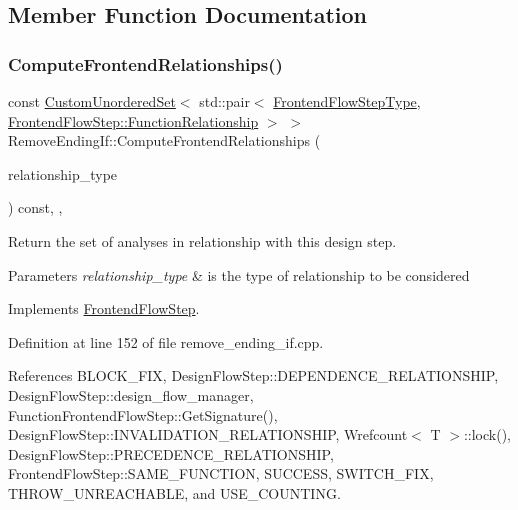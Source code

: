 \subsection{Member Function Documentation}
\mbox{\label{classRemoveEndingIf_a028dba75b4b90e6a322030b4a2d6eebe}} 
\subsubsection{\texorpdfstring{Compute\+Frontend\+Relationships()}{ComputeFrontendRelationships()}}
{\footnotesize\ttfamily const \hyperlink{classCustomUnorderedSet}{Custom\+Unordered\+Set}$<$ std\+::pair$<$ \hyperlink{frontend__flow__step_8hpp_afeb3716c693d2b2e4ed3e6d04c3b63bb}{Frontend\+Flow\+Step\+Type}, \hyperlink{classFrontendFlowStep_af7cf30f2023e5b99e637dc2058289ab0}{Frontend\+Flow\+Step\+::\+Function\+Relationship} $>$ $>$ Remove\+Ending\+If\+::\+Compute\+Frontend\+Relationships (\begin{DoxyParamCaption}\item[{const \hyperlink{classDesignFlowStep_a723a3baf19ff2ceb77bc13e099d0b1b7}{Design\+Flow\+Step\+::\+Relationship\+Type}}]{relationship\+\_\+type }\end{DoxyParamCaption}) const\hspace{0.3cm}{\ttfamily [override]}, {\ttfamily [private]}, {\ttfamily [virtual]}}



Return the set of analyses in relationship with this design step. 


\begin{DoxyParams}{Parameters}
{\em relationship\+\_\+type} & is the type of relationship to be considered \\
\hline
\end{DoxyParams}


Implements \hyperlink{classFrontendFlowStep_abeaff70b59734e462d347ed343dd700d}{Frontend\+Flow\+Step}.



Definition at line 152 of file remove\+\_\+ending\+\_\+if.\+cpp.



References B\+L\+O\+C\+K\+\_\+\+F\+IX, Design\+Flow\+Step\+::\+D\+E\+P\+E\+N\+D\+E\+N\+C\+E\+\_\+\+R\+E\+L\+A\+T\+I\+O\+N\+S\+H\+IP, Design\+Flow\+Step\+::design\+\_\+flow\+\_\+manager, Function\+Frontend\+Flow\+Step\+::\+Get\+Signature(), Design\+Flow\+Step\+::\+I\+N\+V\+A\+L\+I\+D\+A\+T\+I\+O\+N\+\_\+\+R\+E\+L\+A\+T\+I\+O\+N\+S\+H\+IP, Wrefcount$<$ T $>$\+::lock(), Design\+Flow\+Step\+::\+P\+R\+E\+C\+E\+D\+E\+N\+C\+E\+\_\+\+R\+E\+L\+A\+T\+I\+O\+N\+S\+H\+IP, Frontend\+Flow\+Step\+::\+S\+A\+M\+E\+\_\+\+F\+U\+N\+C\+T\+I\+ON, S\+U\+C\+C\+E\+SS, S\+W\+I\+T\+C\+H\+\_\+\+F\+IX, T\+H\+R\+O\+W\+\_\+\+U\+N\+R\+E\+A\+C\+H\+A\+B\+LE, and U\+S\+E\+\_\+\+C\+O\+U\+N\+T\+I\+NG.


